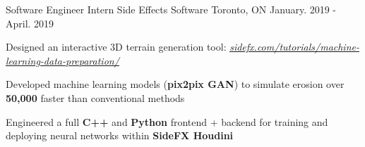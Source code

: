 \begin{cventries}
  \cventry
    {Software Engineer Intern} %
    {Side Effects Software} %
    {Toronto, ON} %
    {January. 2019 - April. 2019} %
    {
      \begin{cvitems} %
        \item {Designed an interactive 3D terrain generation tool: \href{https://www.sidefx.com/tutorials/machine-learning-data-preparation/}{\underline{\textit{sidefx.com/tutorials/machine-learning-data-preparation/}}}}
        \item {Developed machine learning models (\textbf{pix2pix GAN}) to
        simulate erosion over \textbf{50,000\times} faster than conventional methods}
        \item {Engineered a full \textbf{C++} and \textbf{Python} frontend + backend for training and deploying neural networks within \textbf{SideFX Houdini}}
      \end{cvitems}
    }


\end{cventries}
